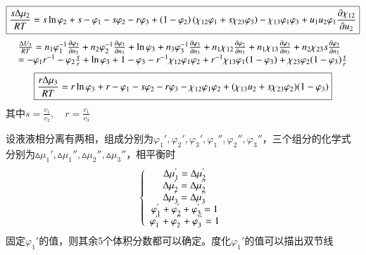 \documentclass{article} %
\begin{document}
\[\boxed{\frac{s{\rm \Delta }\mu _{2} }{RT} =s\ln \varphi _{2} +s-\varphi _{1} -s\varphi _{2} -r\varphi _{3} +\left(1-\varphi _{2} \right)\left(\chi _{12} \varphi _{1} +s\chi _{23} \varphi _{3} \right)-\chi _{13} \varphi _{1} \varphi _{3} +u_{1} u_{2} \varphi _{1} \frac{\partial \chi _{12} }{\partial u_{2} } } \] 
\[\begin{array}{c} {\begin{array}{l} {\frac{{\rm \Delta }U_{3} }{RT} =n_{1} \varphi _{1}^{-1} \frac{\partial \varphi _{3} }{\partial n_{3} } +n_{2} \varphi _{2}^{-1} \frac{\partial \varphi _{3} }{\partial n_{3} } +\ln \varphi _{3} +n_{3} \varphi _{3}^{-1} \frac{\partial \varphi _{3} }{\partial n_{3} } +n_{1} \chi _{12} \frac{\partial \varphi _{2} }{\partial n_{3} } +n_{1} \chi _{13} \frac{\partial \varphi _{3} }{\partial n_{3} } +n_{2} \chi _{23} s\frac{\partial \varphi _{3} }{\partial n_{3} } } \\ {=-\varphi _{1} r^{-1} -\varphi _{2} \frac{s}{r} +\ln \varphi _{3} +1-\varphi _{3} -r^{-1} \chi _{12} \varphi _{1} \varphi _{2} +r^{-1} \chi _{13} \varphi _{1} (1-\varphi _{3} )+\chi _{23} \varphi _{2} (1-\varphi _{3} )\frac{s}{r} } \end{array}} \end{array}\] 
\[\boxed{\frac{r{\rm \Delta }\mu _{3} }{RT} =r\ln \varphi _{3} +r-\varphi _{1} -s\varphi _{2} -r\varphi _{3} -\chi _{12} \varphi _{1} \varphi _{2} +(\chi _{13} u_{2} +s\chi _{23} \varphi _{2} )(1-\varphi _{3} )} \] 
其中$s=\frac{v_{1} }{v_{2} } ,\quad r=\frac{v_{1} }{v_{3} } $ 

\noindent 设液液相分离有两相，组成分别为$\varphi _{1} ',\varphi _{2} ',\varphi _{3} ',\varphi _{1} '',\varphi _{2} '',\varphi _{3} ''$，三个组分的化学式分别为$\vartriangle \mu _{1} ',\vartriangle \mu _{1} '',\vartriangle \mu _{2} '',\vartriangle \mu _{3} ''$，相平衡时
\[\left\{\begin{array}{c} {{\rm \Delta }\mu _{1}^{{'} } ={\rm \Delta }\mu _{2}^{{'} } } \\ {{\rm \Delta }\mu _{2}^{{'} } ={\rm \Delta }\mu _{2}^{{'} {'} } } \\ {{\rm \Delta }\mu _{3}^{{'} } ={\rm \Delta }\mu _{3}^{{'} {'} } } \\ {\varphi _{1}^{{'} } +\varphi _{2}^{{'} } +\varphi _{3}^{{'} } =1} \\ {\varphi _{1}^{{'} {'} } +\varphi _{2}^{{'} {'} } +\varphi _{3}^{{'} {'} } =1} \end{array}\right. \] 
固定$\varphi _{1} '$的值，则其余5个体积分数都可以确定。度化$\varphi _{1} '$的值可以描出双节线
\end{document}
